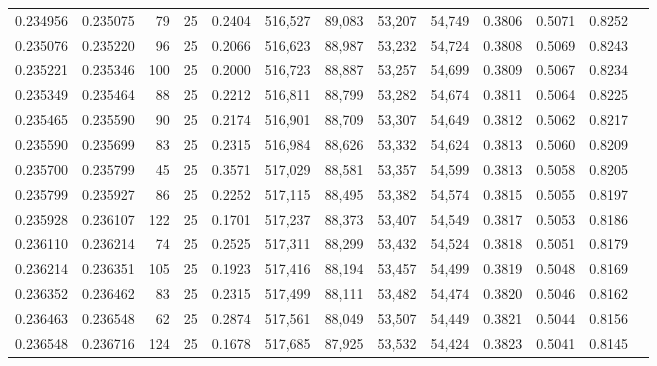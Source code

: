 \begin{tabular}{rrrrrrrrrrrrr}
0.234956 & 0.235075 &    79 &  25 &                                     0.2404 & 516,527 &  89,083 &  53,207 &  54,749 & 0.3806 & 0.5071 & 0.8252 \\
0.235076 & 0.235220 &    96 &  25 &                                     0.2066 & 516,623 &  88,987 &  53,232 &  54,724 & 0.3808 & 0.5069 & 0.8243 \\
0.235221 & 0.235346 &   100 &  25 &                                     0.2000 & 516,723 &  88,887 &  53,257 &  54,699 & 0.3809 & 0.5067 & 0.8234 \\
0.235349 & 0.235464 &    88 &  25 &                                     0.2212 & 516,811 &  88,799 &  53,282 &  54,674 & 0.3811 & 0.5064 & 0.8225 \\
0.235465 & 0.235590 &    90 &  25 &                                     0.2174 & 516,901 &  88,709 &  53,307 &  54,649 & 0.3812 & 0.5062 & 0.8217 \\
0.235590 & 0.235699 &    83 &  25 &                                     0.2315 & 516,984 &  88,626 &  53,332 &  54,624 & 0.3813 & 0.5060 & 0.8209 \\
0.235700 & 0.235799 &    45 &  25 &                                     0.3571 & 517,029 &  88,581 &  53,357 &  54,599 & 0.3813 & 0.5058 & 0.8205 \\
0.235799 & 0.235927 &    86 &  25 &                                     0.2252 & 517,115 &  88,495 &  53,382 &  54,574 & 0.3815 & 0.5055 & 0.8197 \\
0.235928 & 0.236107 &   122 &  25 &                                     0.1701 & 517,237 &  88,373 &  53,407 &  54,549 & 0.3817 & 0.5053 & 0.8186 \\
0.236110 & 0.236214 &    74 &  25 &                                     0.2525 & 517,311 &  88,299 &  53,432 &  54,524 & 0.3818 & 0.5051 & 0.8179 \\
0.236214 & 0.236351 &   105 &  25 &                                     0.1923 & 517,416 &  88,194 &  53,457 &  54,499 & 0.3819 & 0.5048 & 0.8169 \\
0.236352 & 0.236462 &    83 &  25 &                                     0.2315 & 517,499 &  88,111 &  53,482 &  54,474 & 0.3820 & 0.5046 & 0.8162 \\
0.236463 & 0.236548 &    62 &  25 &                                     0.2874 & 517,561 &  88,049 &  53,507 &  54,449 & 0.3821 & 0.5044 & 0.8156 \\
0.236548 & 0.236716 &   124 &  25 &                                     0.1678 & 517,685 &  87,925 &  53,532 &  54,424 & 0.3823 & 0.5041 & 0.8145 \\

\end{tabular}
